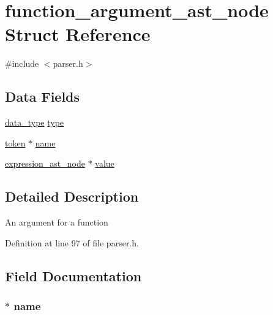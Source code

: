 \hypertarget{structfunction__argument__ast__node}{\section{function\+\_\+argument\+\_\+ast\+\_\+node Struct Reference}
\label{structfunction__argument__ast__node}
}


{\ttfamily \#include $<$parser.\+h$>$}

\subsection*{Data Fields}
\begin{DoxyCompactItemize}
\item 
\hyperlink{parser_8h_ac2ad7f431e3446fddcd9b6b9f93c4c14}{data\+\_\+type} \hyperlink{structfunction__argument__ast__node_aa117a93354fa3056f51378be7065ce33}{type}
\item 
\hyperlink{structtoken}{token} $\ast$ \hyperlink{structfunction__argument__ast__node_a0be25b04f38aae29e2dd7c1b72d4797c}{name}
\item 
\hyperlink{parser_8h_a24e739ff40763d29ca9d4dab5b30819f}{expression\+\_\+ast\+\_\+node} $\ast$ \hyperlink{structfunction__argument__ast__node_a6e64d94a98b3ee7a0420bb0f9a521227}{value}
\end{DoxyCompactItemize}


\subsection{Detailed Description}
An argument for a function 

Definition at line 97 of file parser.\+h.



\subsection{Field Documentation}
\hypertarget{structfunction__argument__ast__node_a0be25b04f38aae29e2dd7c1b72d4797c}{
\subsubsection[{name}]{$\ast$ name}}\label{structfunction__argument__ast__node_a0be25b04f38aae29e2dd7c1b72d4797c}


